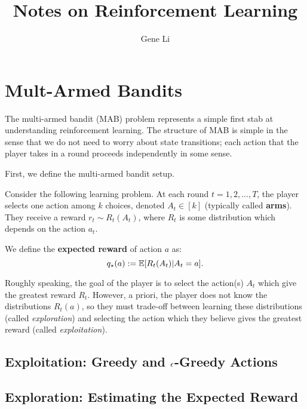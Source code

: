 \documentclass{article}
\title{Notes on Reinforcement Learning}
\author{Gene Li}
\begin{document}
\maketitle


\section{Mult-Armed Bandits}
The multi-armed bandit (MAB) problem represents a simple first stab at understanding reinforcement learning. The structure of MAB is simple in the sense that we do not need to worry about state transitions; each action that the player takes in a round proceeds independently in some sense.

First, we define the multi-armed bandit setup.

\begin{definition}
    Consider the following learning problem. At each round $t=1,2,...,T$, the player selects one action among $k$ choices, denoted $A_t \in [k]$ (typically called \textbf{arms}). They receive a reward $r_t \sim R_t(A_t)$, where $R_t$ is some distribution which depends on the action $a_t$. 
    
    We define the \textbf{expected reward} of action $a$ as:
    \begin{equation}
        q_\star(a) := \operatorname*{\mathbb{E}}[R_t(A_t)|A_t = a].
    \end{equation}
\end{definition}

Roughly speaking, the goal of the player is to select the action(s) $A_t$ which give the greatest reward $R_t$. However, a priori, the player does not know the distributions $R_t(a)$, so they must trade-off between learning these distributions (called \textit{exploration}) and selecting the action which they believe gives the greatest reward (called \textit{exploitation}).

\subsection{Exploitation: Greedy and $\epsilon$-Greedy Actions}

\subsection{Exploration: Estimating the Expected Reward}
\end{document}
